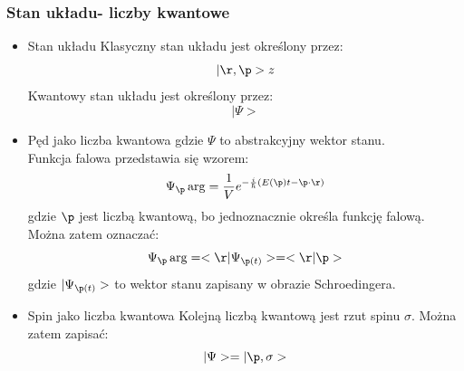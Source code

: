 \subsubsection{Stan układu- liczby kwantowe}
\begin{itemize}
\item Stan układu
Klasyczny stan układu jest określony przez:
\begin{equation} |\r,\p>z\end{equation}
Kwantowy stan układu jest określony przez:
\begin{equation} |\Psi>\end{equation}
\item Pęd jako liczba kwantowa
gdzie $\Psi$ to abstrakcyjny wektor stanu.\\
Funkcja falowa przedstawia się wzorem:
\begin{equation}\Psi_{\p}\arg=\frac{1}{V}e^{-\frac{i}{\hbar}(E(\p)t-\p\cdot\r)}\end{equation}
gdzie $\p$ jest liczbą kwantową, bo jednoznacznie określa funkcję falową. Można zatem oznaczać:
\begin{equation} \Psi_{\p}\arg=< \r|\Psi_{\p(t)}>=< \r|\p>\end{equation}
gdzie $|\Psi_{\p(t)}>$ to wektor stanu zapisany w obrazie Schroedingera.\\
\item Spin jako liczba kwantowa
Kolejną liczbą kwantową jest rzut spinu $\sigma$. Można zatem zapisać:
\begin{equation}|\Psi>=|\p,\sigma>\end{equation}
\end{itemize}
